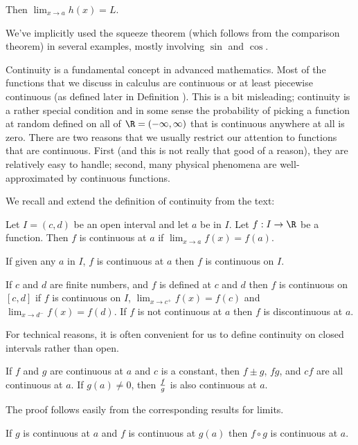 Then $\displaystyle{\lim _{x\to a} }h(x) =L $.
\endthmnoproof

We've implicitly used the squeeze theorem (which follows from the comparison theorem) in several examples, mostly
 involving $\sin $ and $\cos $.

Continuity is a fundamental concept in advanced mathematics. Most of
the functions that we discuss in calculus are continuous or at least
{\dfont piecewise continuous} (as defined
later in Definition ).
This is a bit misleading; continuity is a rather special
condition and in some sense the probability of picking a function at
random defined on all of $\R=(-\infty, \infty )$ that is
continuous anywhere at all is zero. There are two reasons that we
usually restrict our attention to functions that are continuous. First
(and this is not really that good of a reason), they are relatively
easy to handle; second, many physical phenomena are well-approximated
by continuous functions.

We recall and extend the definition of continuity from the text:

 Let $I=(c,d) $ be an open interval and let $a$ be in $I$. Let
 $f:I \to \R$ be a function.  Then $f$ is continuous
 at $a$ if $\displaystyle{\lim _{x\to a} f(x) }= f(a). $

 If given any $a$ in $I$, $f$ is continuous at $a$ then $f$ is
 continuous on $I$.

 If $c$ and $d$ are finite numbers, and $f$ is defined at $c$ and $d$
  then $f$ is continuous on $[c,d] $ if $f$ is continuous on $I$,
  $\displaystyle{\lim _{x\to c^+ } f(x) }= f(c)$ and
  $\displaystyle{\lim _{x\to d^- } f(x) }= f(d)$. If $f$ is not
  continuous at $a$ then $f$ is {\dfont
  discontinuous} at $a$.
\enddef 

For technical reasons, it is often convenient for us to define continuity
on closed intervals rather than open.

\thm If $f$ and $g$ are continuous at $a$ and $c$ is a constant,
 then $f\pm g$, $fg$, and $cf $ are all continuous at $a$. If $g(a) \neq 0 $, then
  ${f\over g} $ is also continuous at $a$.
  \endthmnoproof

The proof follows easily from the corresponding results for limits.

  \thm If $g$ is continuous at $a$ and $f$ is continuous at $g(a) $
   then $f\circ g $ is continuous at $a$.
   \endthmnoproof

